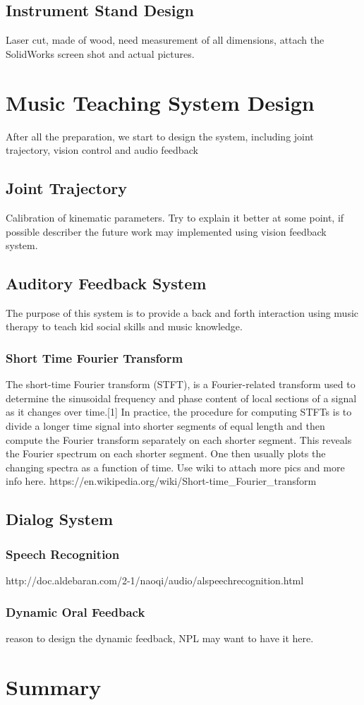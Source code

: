 \subsection{Instrument Stand Design}
Laser cut, made of wood, need measurement of all dimensions, attach the SolidWorks
screen shot and actual pictures.

\section{Music Teaching System Design}
After all the preparation, we start to design the system, including joint trajectory, vision control and audio feedback

\subsection{Joint Trajectory}
Calibration of kinematic parameters. Try to explain it better at some point, if possible describer the future work may implemented using vision feedback system. 

\subsection{Auditory Feedback System}
The purpose of this system is to provide a back and forth interaction using music therapy to teach kid social skills and music knowledge.

\subsubsection{Short Time Fourier Transform}
The short-time Fourier transform (STFT), is a Fourier-related transform used to determine the sinusoidal frequency and phase content of local sections of a signal as it changes over time.[1] In practice, the procedure for computing STFTs is to divide a longer time signal into shorter segments of equal length and then compute the Fourier transform separately on each shorter segment. This reveals the Fourier spectrum on each shorter segment. One then usually plots the changing spectra as a function of time.
Use wiki to attach more pics and more info here.
https://en.wikipedia.org/wiki/Short-time_Fourier_transform

\subsection{Dialog System}

\subsubsection{Speech Recognition}
http://doc.aldebaran.com/2-1/naoqi/audio/alspeechrecognition.html

\subsubsection{Dynamic Oral Feedback}
reason to design the dynamic feedback, NPL may want to have it here. 



\section{Summary}

